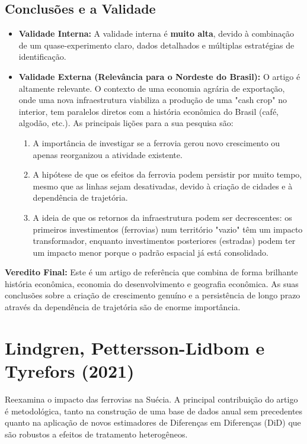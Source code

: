 \documentclass[12pt, a4paper]{article}
\begin{document}
\subsection{Conclusões e a Validade}
\begin{itemize}
    \item \textbf{Validade Interna:} A validade interna é \textbf{muito alta}, devido à combinação de um quase-experimento claro, dados detalhados e múltiplas estratégias de identificação.
    \item \textbf{Validade Externa (Relevância para o Nordeste do Brasil):} O artigo é altamente relevante. O contexto de uma economia agrária de exportação, onde uma nova infraestrutura viabiliza a produção de uma "cash crop" no interior, tem paralelos diretos com a história econômica do Brasil (café, algodão, etc.). As principais lições para a sua pesquisa são:
        \begin{enumerate}
            \item A importância de investigar se a ferrovia gerou novo crescimento ou apenas reorganizou a atividade existente.
            \item A hipótese de que os efeitos da ferrovia podem persistir por muito tempo, mesmo que as linhas sejam desativadas, devido à criação de cidades e à dependência de trajetória.
            \item A ideia de que os retornos da infraestrutura podem ser decrescentes: os primeiros investimentos (ferrovias) num território "vazio" têm um impacto transformador, enquanto investimentos posteriores (estradas) podem ter um impacto menor porque o padrão espacial já está consolidado.
        \end{enumerate}
\end{itemize}

\noindent\textbf{Veredito Final:} Este é um artigo de referência que combina de forma brilhante história econômica, economia do desenvolvimento e geografia econômica. As suas conclusões sobre a criação de crescimento genuíno e a persistência de longo prazo através da dependência de trajetória são de enorme importância. 

\section{Lindgren, Pettersson-Lidbom e Tyrefors (2021)}
Reexamina o impacto das ferrovias na Suécia. A principal contribuição do artigo é metodológica, tanto na construção de uma base de dados anual sem precedentes quanto na aplicação de novos estimadores de Diferenças em Diferenças (DiD) que são robustos a efeitos de tratamento heterogêneos.
\end{document}
